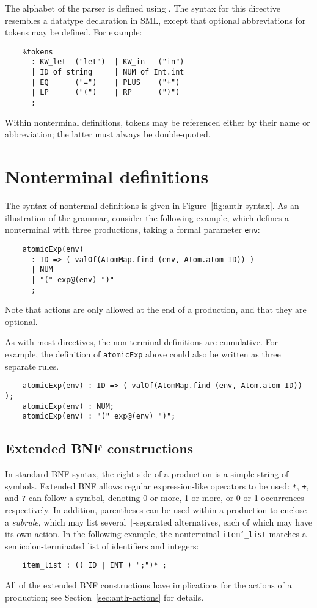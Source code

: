 The alphabet of the parser is defined using .  The syntax for this directive resembles a datatype declaration in SML, except that optional abbreviations for tokens may be defined.  For example:
\begin{verbatim}
    %tokens
      : KW_let  ("let")  | KW_in   ("in")
      | ID of string     | NUM of Int.int
      | EQ      ("=")    | PLUS    ("+")
      | LP      ("(")    | RP      (")")
      ;
\end{verbatim}
Within nonterminal definitions, tokens may be referenced either by their name or abbreviation; the latter must always be double-quoted.

\section{Nonterminal definitions}\label{sec:antlr-nt}

The syntax of nontermal definitions is given in Figure~\ref{fig:antlr-syntax}.  As an illustration of the grammar, consider the following example, which defines a nonterminal with three productions, taking a formal parameter \texttt{env}:
\begin{verbatim}
    atomicExp(env)
      : ID => ( valOf(AtomMap.find (env, Atom.atom ID)) )
      | NUM
      | "(" exp@(env) ")"
      ;
\end{verbatim}
Note that actions are only allowed at the end of a production, and that they are optional.

As with most directives, the non-terminal definitions are cumulative.
For example, the definition of \texttt{atomicExp} above could also be
written as three separate rules.
\begin{verbatim}
    atomicExp(env) : ID => ( valOf(AtomMap.find (env, Atom.atom ID)) );
    atomicExp(env) : NUM;
    atomicExp(env) : "(" exp@(env) ")";
\end{verbatim}

\subsection{Extended BNF constructions}

In standard BNF syntax, the right side of a production is a simple string of symbols.  Extended BNF allows regular expression-like operators to be used: \texttt{*}, \texttt{+}, and \texttt{?} can follow a symbol, denoting 0 or more, 1 or more, or 0 or 1 occurrences respectively.  In addition, parentheses can be used within a production to enclose a \emph{subrule}, which may list several \texttt{|}-separated alternatives, each of which may have its own action.  In the following example, the nonterminal \texttt{item\char`\_list} matches a semicolon-terminated list of identifiers and integers:
\begin{verbatim}
    item_list : (( ID | INT ) ";")* ;
\end{verbatim}
All of the extended BNF constructions have implications for the actions of a production; see Section~\ref{sec:antlr-actions} for details.

